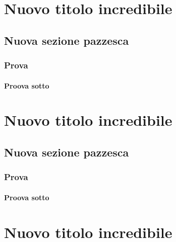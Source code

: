 \documentclass[a4paper, 11pt, openright, twoside]{report}
\begin{document}
\chapter[Nuovo titolo incredibile]{Nuovo titolo incredibile}
\label{chap:Nuovo titolo incredibile}

\lipsum[1]

\section[Nuova sezione pazzesca]{Nuova sezione pazzesca}
\label{chap:Nuova sezione pazzesca}

\subsection[Prova]{Prova}
\label{chap:Prova}

\subsubsection[Proova sotto]{Proova sotto}
\label{chap:Proova sotto}


\chapter[Nuovo titolo incredibile]{Nuovo titolo incredibile}
\label{chap:Nuovo titolo incredibile}

\lipsum[1]

\section[Nuova sezione pazzesca]{Nuova sezione pazzesca}
\label{chap:Nuova sezione pazzesca}

\subsection[Prova]{Prova}
\label{chap:Prova}

\subsubsection[Proova sotto]{Proova sotto}
\label{chap:Proova sotto}

\chapter[Nuovo titolo incredibile]{Nuovo titolo incredibile}
\label{chap:Nuovo titolo incredibile}
\end{document}
